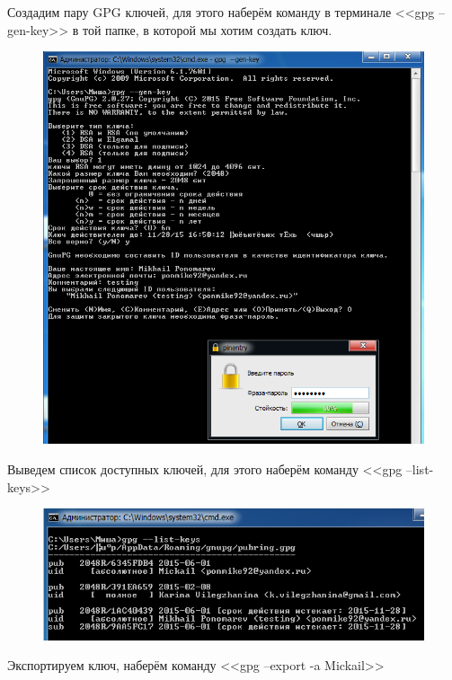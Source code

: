 \documentclass[utf8x, 12pt]{G7-32}
\begin{document}
\medskip

Создадим пару GPG ключей, для этого наберём команду в терминале <<gpg --gen-key>> в той папке, в которой мы хотим создать ключ.

\begin{figure}[hhh!]
	\begin{center}
		\includegraphics[width=12cm]{img/8_1}
	\end{center}
\end{figure}	


Выведем список доступных ключей, для этого наберём команду \linebreak <<gpg --list-keys>>

\begin{figure}[hhh!]
	\begin{center}
		\includegraphics[width=12cm]{img/8_2}
	\end{center}
\end{figure}	

Экспортируем ключ, наберём команду <<gpg --export -a Mickail>>
\end{document}
